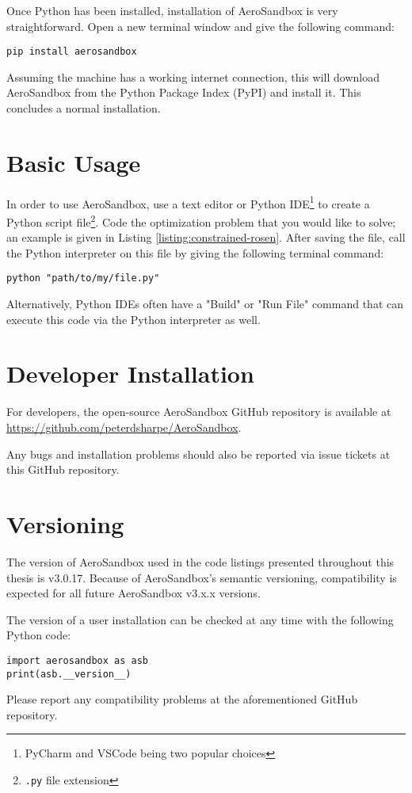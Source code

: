 Once Python has been installed, installation of AeroSandbox is very straightforward. Open a new terminal window and give the following command:
\begin{verbatim}
pip install aerosandbox
\end{verbatim}

Assuming the machine has a working internet connection, this will download AeroSandbox from the Python Package Index (PyPI) and install it. This concludes a normal installation.


\section{Basic Usage}

In order to use AeroSandbox, use a text editor or Python IDE\footnote{PyCharm and VSCode being two popular choices} to create a Python script file\footnote{\texttt{.py} file extension}. Code the optimization problem that you would like to solve; an example is given in Listing \ref{listing:constrained-rosen}. After saving the file, call the Python interpreter on this file by giving the following terminal command:
\begin{verbatim}
python "path/to/my/file.py"
\end{verbatim}

Alternatively, Python IDEs often have a "Build" or "Run File" command that can execute this code via the Python interpreter as well.


\section{Developer Installation}

For developers, the open-source AeroSandbox GitHub repository is available at \url{https://github.com/peterdsharpe/AeroSandbox}.

Any bugs and installation problems should also be reported via issue tickets at this GitHub repository.


\section{Versioning}

The version of AeroSandbox used in the code listings presented throughout this thesis is v3.0.17. Because of AeroSandbox's semantic versioning, compatibility is expected for all future AeroSandbox v3.x.x versions.

The version of a user installation can be checked at any time with the following Python code:

\begin{verbatim}
import aerosandbox as asb
print(asb.__version__)
\end{verbatim}

Please report any compatibility problems at the aforementioned GitHub repository.
